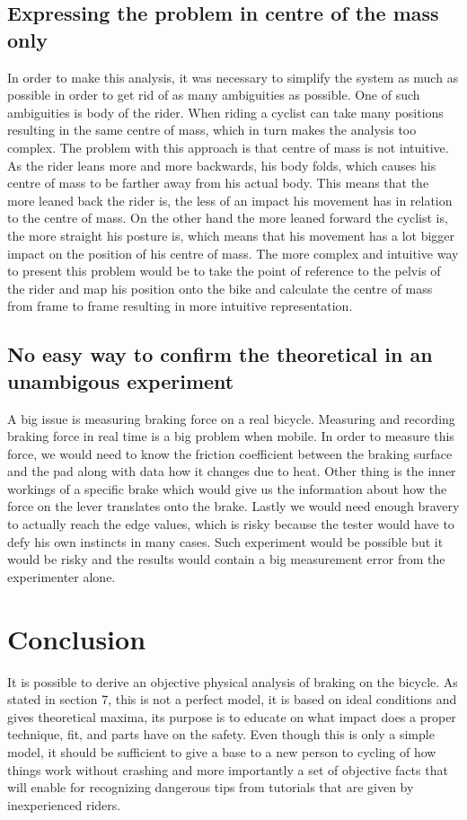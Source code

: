\documentclass[12pt, a4]{article}
\begin{document}
\subsection{Expressing the problem in centre of the mass only}
In order to make this analysis, it was necessary to simplify the system as much as possible in order to get rid of as many ambiguities
as possible. One of such ambiguities is body of the rider. When riding a cyclist can take many positions resulting in the same centre
of mass, which in turn makes the analysis too complex. The problem with this approach is that centre of mass is not intuitive. As the
rider leans more and more backwards, his body folds, which causes his centre of mass to be farther away from his actual body. This 
means that the more leaned back the rider is, the less of an impact his movement has in relation to the centre of mass. On the other
hand the more leaned forward the cyclist is, the more straight his posture is, which means that his movement has a lot bigger impact 
on the position of his centre of mass. The more complex and intuitive way to present this problem would be to take the point of 
reference to the pelvis of the rider and map his position onto the bike and calculate the centre of mass from frame to frame resulting
in more intuitive representation.
\subsection{No easy way to confirm the theoretical in an unambigous experiment}
A big issue is measuring braking force on a real bicycle. Measuring and recording braking force in real time is a big problem when 
mobile. In order to measure this force, we would need to know the friction coefficient between the braking surface and the pad along
with data how it changes due to heat. Other thing is the inner workings of a specific brake which would give us the information about
how the force on the lever translates onto the brake. Lastly we would need enough bravery to actually reach the edge values, which
is risky because the tester would have to defy his own instincts in many cases. Such experiment would be possible but it would be risky
and the results would contain a big measurement error from the experimenter alone.

\section{Conclusion}
It is possible to derive an objective physical analysis of braking on the bicycle. As stated in section 7, this is not a perfect model, 
it is based on ideal conditions and gives theoretical maxima, its purpose is to educate on 
what impact does a proper technique, fit, and parts have on the safety. Even though this is only a simple model, it should be sufficient
to give a base to a new person to cycling of how things work without crashing and more importantly a set of objective facts that will
enable for recognizing dangerous tips from tutorials that are given by inexperienced riders.
\end{document}
